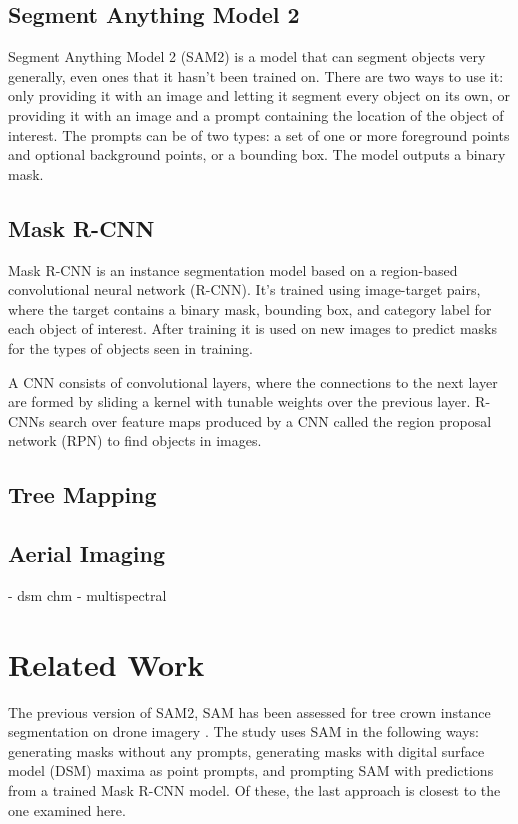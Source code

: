 \documentclass[english, 12pt, a4paper, sci, utf8, a-2b, online]{aaltothesis}
\begin{document}
\subsection{Segment Anything Model 2}

Segment Anything Model 2 (SAM2) is a model that can segment objects very generally, even ones that it hasn't been trained on. There are two ways to use it: only providing it with an image and letting it segment every object on its own, or providing it with an image and a prompt containing the location of the object of interest. The prompts can be of two types: a set of one or more foreground points and optional background points, or a bounding box. The model outputs a binary mask.

\subsection{Mask R-CNN}

Mask R-CNN is an instance segmentation model based on a region-based convolutional neural network (R-CNN). It's trained using image-target pairs, where the target contains a binary mask, bounding box, and category label for each object of interest. After training it is used on new images to predict masks for the types of objects seen in training.

A CNN consists of convolutional layers, where the connections to the next layer are formed by sliding a kernel with tunable weights over the previous layer. R-CNNs search over feature maps produced by a CNN called the region proposal network (RPN) to find objects in images.

\subsection{Tree Mapping}
\subsection{Aerial Imaging}
- dsm chm
- multispectral

\newpage
\section{Related Work}

The previous version of SAM2, SAM has been assessed for tree crown instance segmentation on drone imagery \cite{sam-treecrown}. The study uses SAM in the following ways: generating masks without any prompts, generating masks with digital surface model (DSM) maxima as point prompts, and prompting SAM with predictions from a trained Mask R-CNN model. Of these, the last approach is closest to the one examined here.
\end{document}

